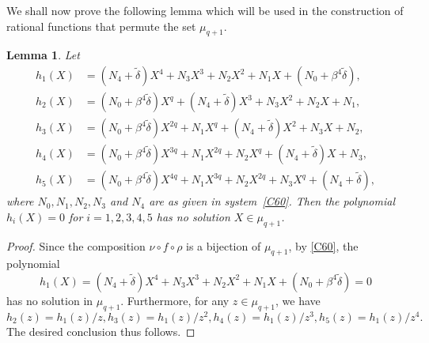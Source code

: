 \documentclass[12pt]{amsart}
\newtheorem{lem}[thm]{Lemma}
\newtheorem{rmk}[thm]{Remark}
\numberwithin{equation}{section}
\theoremstyle{definition}
\begin{document}

We shall now prove the following lemma which will be used in the construction of rational functions that permute the set $\mu_{q+1}$.

\begin{lem} \label{L61}
 Let
 \begin{equation*}
  \begin{split}
   h_1(X)&= (N_4+{\tilde \delta})X^4 +N_3X^3+ N_2X^2+ N_1X+(N_0 + \beta^4{\tilde \delta}),\\
   h_2(X)&= (N_0 +\beta^4  {\tilde \delta})X^q+(N_4+{\tilde \delta})X^3 +N_3X^2+ N_2X+ N_1,\\
   h_3(X)&= (N_0 + \beta^4 {\tilde \delta})X^{2q}+N_1X^q+(N_4+{\tilde \delta})X^2 +N_3X+ N_2, \\
   h_4(X) &= (N_0 +\beta^4 {\tilde \delta})X^{3q}+N_1X^{2q}+N_2X^q+(N_4+{\tilde \delta})X +N_3, \\
   h_5(X) &= (N_0 + \beta^4{\tilde \delta})X^{4q}+N_1X^{3q}+N_2X^{2q}+N_3X^q+(N_4+{\tilde \delta}),
  \end{split}
 \end{equation*}
where $N_0, N_1, N_2, N_3$ and $N_4$ are as given in system~\eqref{C60}. 
Then the polynomial $h_i(X)=0$ for $i=1,2,3,4,5$ has no solution $X \in \mu_{q+1}$.
\end{lem}
\begin{proof} Since the composition $\nu \circ f \circ \rho$ is a bijection of $\mu_{q+1}$,
by \eqref{C60}, the polynomial 
$$
h_1(X)= (N_4+{\tilde \delta})X^4 +N_3X^3+ N_2X^2+ N_1X+(N_0 + \beta^4{\tilde \delta}) = 0
$$ has no solution in $\mu_{q+1}$. Furthermore, for any $z\in \mu_{q+1}$,
we have 
$$
h_2(z) = h_1(z)/z, h_3(z) = h_1(z)/z^2, h_4(z) = h_1(z)/z^3, h_5(z) = h_1(z)/z^4.
$$
The desired conclusion thus follows.
\end{proof}
\end{document}

